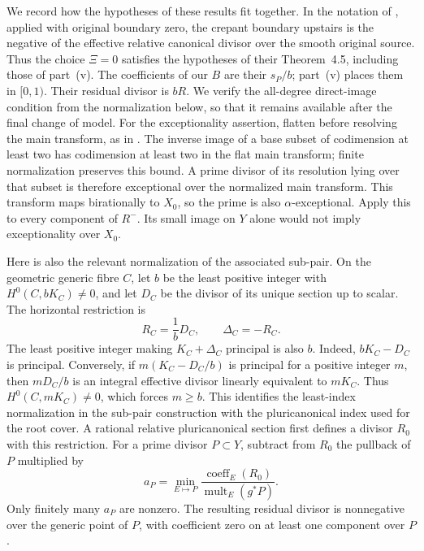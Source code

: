 We record how the hypotheses of these results fit together.
In the notation of \cite[\S4.4]{FujinoMori}, applied with original boundary
zero, the crepant boundary upstairs is the negative of the effective
relative canonical divisor over the smooth original source.
Thus the choice \(\Xi=0\) satisfies the hypotheses of their
Theorem~4.5, including those of part~(v).
The coefficients of our \(B\) are their \(s_P/b\); part~(v) places them
in \([0,1)\).  Their residual divisor is \(bR\).
We verify the all-degree direct-image condition from the normalization
below, so that it remains available after the final change of model.
For the exceptionality assertion, flatten before resolving the main
transform, as in \cite[\S4.4]{FujinoMori}.  The inverse image of a base
subset of codimension at least two has codimension at least two in
the flat main transform; finite normalization preserves this bound.
A prime divisor of its resolution lying over that subset is therefore
exceptional over the normalized main transform.  This transform maps
birationally to \(X_0\), so the prime is also \(\alpha\)-exceptional.
Apply this to every component of \(R^-\).  Its small image on \(Y\)
alone would not imply exceptionality over \(X_0\).

Here is also the relevant normalization of the associated sub-pair.
On the geometric generic fibre \(C\), let \(b\) be the least positive
integer with \(H^0(C,bK_C)\ne0\), and let \(D_C\) be the divisor of its
unique section up to scalar.  The horizontal restriction is
\[
 R_C=\frac1bD_C,\qquad
 \Delta_C=-R_C.
\]
The least positive integer making \(K_C+\Delta_C\) principal is
also \(b\). Indeed, \(bK_C-D_C\) is principal. Conversely, if
\(m(K_C-D_C/b)\) is principal for a positive integer \(m\), then
\(mD_C/b\) is an integral effective divisor linearly equivalent to
\(mK_C\). Thus \(H^0(C,mK_C)\ne0\), which forces \(m\geq b\).
This identifies the least-index normalization in the sub-pair
construction with the pluricanonical index used for the root cover.
A rational relative pluricanonical section first defines a divisor
\(R_0\) with this restriction.  For a prime divisor \(P\subset Y\),
subtract from \(R_0\) the pullback of \(P\) multiplied by
\[
 a_P=\min_{E\mapsto P}
       \frac{\operatorname{coeff}_E(R_0)}
            {\operatorname{mult}_E(g^*P)}.
\]
Only finitely many \(a_P\) are nonzero.  The resulting residual divisor
is nonnegative over the generic point of \(P\), with coefficient zero
on at least one component over \(P\).

